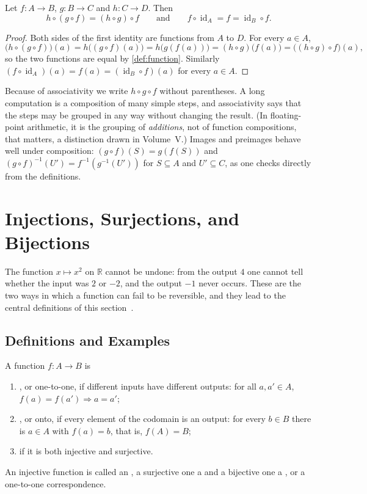 \begin{proposition}
\label{prop:composition}
Let $f\colon A\to B$, $g\colon B\to C$ and $h\colon C\to D$. Then
\[
h\circ(g\circ f)=(h\circ g)\circ f
\qquad\text{and}\qquad
f\circ\operatorname{id}_A=f=\operatorname{id}_B\circ f .
\]
\end{proposition}

\begin{proof}
Both sides of the first identity are functions from $A$ to $D$. For every $a\in A$,
\[
\bigl(h\circ(g\circ f)\bigr)(a)=h\bigl((g\circ f)(a)\bigr)=h\bigl(g(f(a))\bigr)
=(h\circ g)\bigl(f(a)\bigr)=\bigl((h\circ g)\circ f\bigr)(a),
\]
so the two functions are equal by \cref{def:function}. Similarly $(f\circ\operatorname{id}_A)(a)=f(a)=(\operatorname{id}_B\circ f)(a)$ for every $a\in A$.
\end{proof}

Because of associativity we write $h\circ g\circ f$ without parentheses. A long computation is a composition of many simple steps, and associativity says that the steps may be grouped in any way without changing the result. (In floating-point arithmetic, it is the grouping of \emph{additions}, not of function compositions, that matters, a distinction drawn in Volume~V.) Images and preimages behave well under composition: $(g\circ f)(S)=g(f(S))$ and $(g\circ f)^{-1}(U')=f^{-1}(g^{-1}(U'))$ for $S\subseteq A$ and $U'\subseteq C$, as one checks directly from the definitions.

\section{Injections, Surjections, and Bijections}
\label{sec:injections}

The function $x\mapsto x^2$ on $\mathbb R$ cannot be undone: from the output $4$ one cannot tell whether the input was $2$ or $-2$, and the output $-1$ never occurs. These are the two ways in which a function can fail to be reversible, and they lead to the central definitions of this section~\cite{velleman2019,halmos1960naive}.

\subsection{Definitions and Examples}

\begin{definition}
\label{def:injective}
A function $f\colon A\to B$ is
\begin{enumerate}
\item {}, or one-to-one, if different inputs have different outputs: for all $a,a'\in A$, $f(a)=f(a')\Rightarrow a=a'$;
\item {}, or onto, if every element of the codomain is an output: for every $b\in B$ there is $a\in A$ with $f(a)=b$, that is, $f(A)=B$;
\item {} if it is both injective and surjective.
\end{enumerate}
An injective function is called an , a surjective one a  and a bijective one a , or a one-to-one correspondence.
\end{definition}

